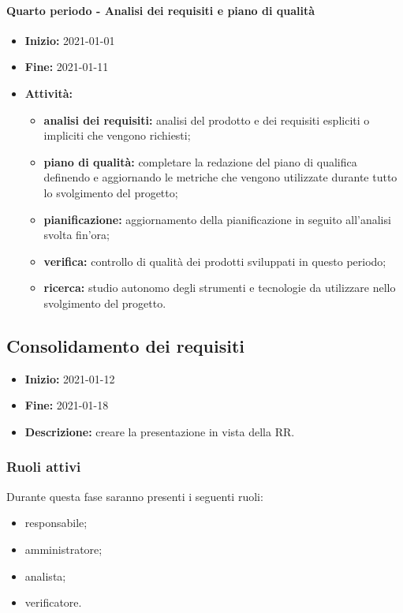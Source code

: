 \paragraph[Quarto periodo]{Quarto periodo - \textnormal{Analisi dei requisiti e piano di qualità}}
\begin{itemize}
    \item [] \textbf{Inizio:} 2021-01-01
    \item [] \textbf{Fine:} 2021-01-11
    \item [] \textbf{Attività:}
          \begin{itemize}
              \item \textbf{analisi dei requisiti:} analisi del prodotto e dei requisiti espliciti o impliciti che vengono richiesti;
              \item \textbf{piano di qualità:} completare la redazione del piano di qualifica definendo e aggiornando le metriche che vengono utilizzate durante tutto lo svolgimento del progetto;
              \item \textbf{pianificazione:} aggiornamento della pianificazione in seguito all'analisi svolta fin'ora;
              \item \textbf{verifica:} controllo di qualità dei prodotti sviluppati in questo periodo;
              \item \textbf{ricerca:} studio autonomo degli strumenti e tecnologie da utilizzare nello svolgimento del progetto.
          \end{itemize}
\end{itemize}


\subsection{Consolidamento dei requisiti} \label{_pianificazioneConsolidamentoDeiRequisiti}
\begin{itemize}
    \item []\textbf{Inizio:} 2021-01-12
    \item []\textbf{Fine:} 2021-01-18
    \item []\textbf{Descrizione:} creare la presentazione in vista della RR.
\end{itemize}

\subsubsection{Ruoli attivi}
Durante questa fase saranno presenti i seguenti ruoli:
\begin{itemize}
    \item responsabile;
    \item amministratore;
    \item analista;
    \item verificatore.
\end{itemize}

